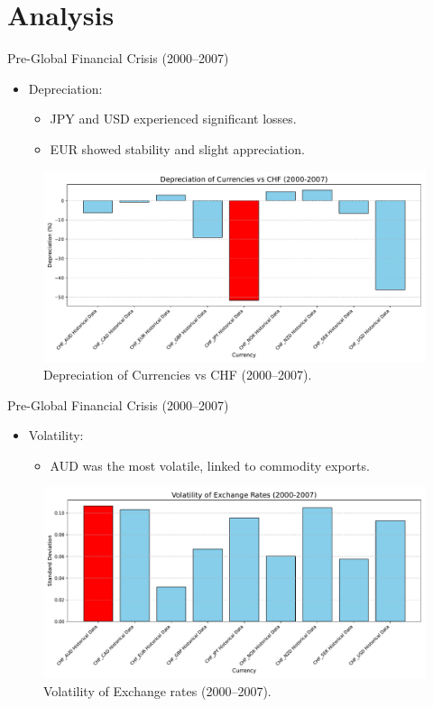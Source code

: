 \documentclass{beamer}
\begin{document}
\section{Analysis}
\begin{frame}{Pre-Global Financial Crisis (2000--2007)}
  \begin{itemize}
    \item Depreciation:
    \begin{itemize}
      \item JPY and USD experienced significant losses.
      \item EUR showed stability and slight appreciation.
    \end{itemize}
   \end{itemize}

    \begin{figure}
    \centering
        \includegraphics[width=0.75
        \textwidth]{../../images/depreciation_2000_2007.pdf}
        \caption{Depreciation of Currencies vs CHF (2000--2007).}
        \label{fig:question}
    \end{figure}
    
\end{frame}


\begin{frame}{Pre-Global Financial Crisis (2000--2007)}
  \begin{itemize}
     \item Volatility:
    \begin{itemize}
      \item AUD was the most volatile, linked to commodity exports.
    \end{itemize}
   \end{itemize}

    \begin{figure}
    \centering
        \includegraphics[width=0.75
        \textwidth]{../../images/volatility_2000_2007.pdf}
        \caption{Volatility of Exchange rates (2000--2007).}
        \label{fig:question}
    \end{figure}
    
\end{frame}
\end{document}
